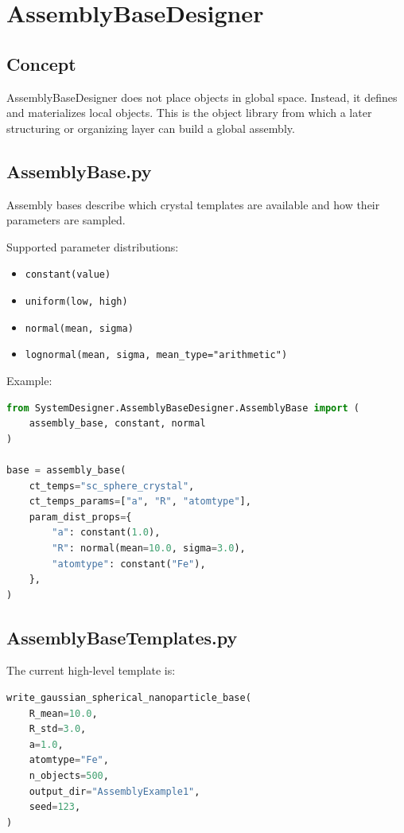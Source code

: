 \documentclass[11pt,a4paper]{article}
\begin{document}
\section{AssemblyBaseDesigner}

\subsection{Concept}

AssemblyBaseDesigner does not place objects in global space. Instead, it
defines and materializes local objects. This is the object library from which a
later structuring or organizing layer can build a global assembly.

\subsection{AssemblyBase.py}

Assembly bases describe which crystal templates are available and how their
parameters are sampled.

Supported parameter distributions:

\begin{itemize}[nosep]
    \item \texttt{constant(value)}
    \item \texttt{uniform(low, high)}
    \item \texttt{normal(mean, sigma)}
    \item \texttt{lognormal(mean, sigma, mean\_type="arithmetic")}
\end{itemize}

Example:

\begin{lstlisting}[language=Python]
from SystemDesigner.AssemblyBaseDesigner.AssemblyBase import (
    assembly_base, constant, normal
)

base = assembly_base(
    ct_temps="sc_sphere_crystal",
    ct_temps_params=["a", "R", "atomtype"],
    param_dist_props={
        "a": constant(1.0),
        "R": normal(mean=10.0, sigma=3.0),
        "atomtype": constant("Fe"),
    },
)
\end{lstlisting}

\subsection{AssemblyBaseTemplates.py}

The current high-level template is:

\begin{lstlisting}[language=Python]
write_gaussian_spherical_nanoparticle_base(
    R_mean=10.0,
    R_std=3.0,
    a=1.0,
    atomtype="Fe",
    n_objects=500,
    output_dir="AssemblyExample1",
    seed=123,
)
\end{lstlisting}
\end{document}
